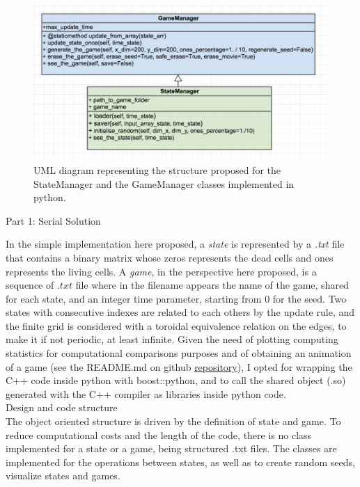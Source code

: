 \documentclass[11pt, twoside]{article}
\begin{document}
\begin{figure}[htbp]
	\centering
	\includegraphics[scale=0.45]{figures/uml_py.pdf}
	\caption{UML diagram representing the structure proposed for the StateManager and the GameManager classes implemented in python.}
	\label{fig:uml_py}
\end{figure}


\begin{center}
	\color{MidnightBlue} {\Large Part 1: Serial Solution }\color{Black} 
\end{center}

\noindent
In the simple implementation here proposed, a \emph{state} is represented by a \emph{.txt} file that contains a binary matrix whose zeros represents the dead cells and ones represents the living cells. A \emph{game}, in the perspective here proposed, is a sequence of $.txt$ file where in the filename appears the name of the game, shared for each state, and an integer time parameter, starting from $0$ for the seed. Two states with consecutive indexes are related to each others by the update rule, and the finite grid is considered with a toroidal equivalence relation on the edges, to make it if not periodic, at least infinite.
Given the need of plotting computing statistics for computational comparisons purposes and of obtaining an animation of a game (see the README.md on github \href{https://github.com/SebastianoF/game_of_life}{repository}), I opted for wrapping the C++ code inside python with boost::python, and to call the shared object (.so) generated with the C++ compiler as libraries inside python code. \\

\noindent
\color{MidnightBlue} {\Large Design and code structure }\color{Black}  \\
The object oriented structure is driven by the definition of state and game. To reduce computational costs and the length of the code, there is no class implemented for a state or a game, being structured .txt files. The classes are implemented for the operations between states, as well as to create random seeds, visualize states and games.
\end{document}
